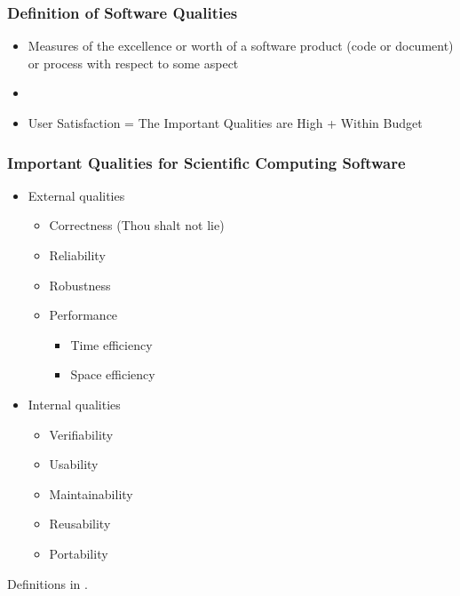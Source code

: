 \documentclass[t,12pt,numbers,fleqn]{beamer}
\begin{document}

\begin{frame}
\frametitle{Definition of Software Qualities}

\begin{itemize}
\item Measures of the excellence or worth of a software product (code or document) or process
with respect to some aspect
\item {}
\item User Satisfaction = The Important Qualities are High + Within Budget
\end{itemize}
\end{frame}


\begin{frame}

\frametitle{Important Qualities for Scientific Computing Software}

\begin{itemize}

\item External qualities
\begin{itemize}
\item Correctness (Thou shalt not lie)
\item Reliability
\item Robustness
\item Performance
\begin{itemize}
\item Time efficiency
\item Space efficiency
\end{itemize}
\end{itemize}

\item Internal qualities
\begin{itemize}
\item Verifiability
\item Usability
\item Maintainability
\item Reusability
\item Portability
\end{itemize}

\end{itemize}

Definitions in \cite{GhezziEtAl2003}.

\end{frame}
\end{document}
